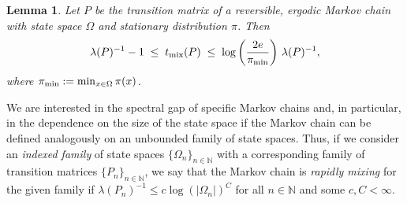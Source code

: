 \documentclass{dis}
\newtheorem{lemma}[theorem]{Lemma}
\theoremstyle{citing}
\begin{document}
\begin{lemma} \label{lemma:mixing-gap}
Let $P$ be the transition matrix of a reversible, ergodic Markov chain with 
state space ${\Omega}$ and stationary distribution $\pi$. Then
\[
\lambda(P)^{-1}-1 \;\le\; t_{\rm mix}(P) 
\;\le\; \log\left(\frac{2e}{\pi_{\rm min}}\right)\,\lambda(P)^{-1}, 
\]
where $\pi_{\rm min}:=\min_{x\in{\Omega}}\pi(x)$.
\end{lemma}

We are interested in the spectral gap of specific Markov chains and, 
in particular, in the dependence on the size of the state space 
if the Markov chain can be defined analogously on an unbounded 
family of state spaces.
Thus, if we consider an \emph{indexed family} of state spaces
$\{{\Omega}_n\}_{n\in{\ensuremath{\mathbb{N}}}}$ with a corresponding family of transition 
matrices $\{P_n\}_{n\in{\ensuremath{\mathbb{N}}}}$, we say that the Markov chain is 
\emph{rapidly mixing}
for the given family if 
$\lambda(P_n)^{-1} \le c\log(|{\Omega}_n|)^C$
for all $n\in{\ensuremath{\mathbb{N}}}$ and some $c,C < \infty$.
\end{document}
